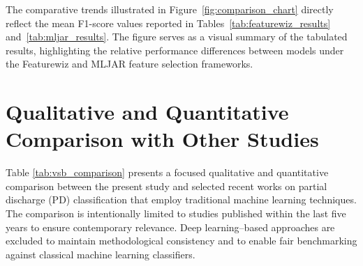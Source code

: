 The comparative trends illustrated in Figure~\ref{fig:comparison_chart} directly reflect the mean F1-score values reported in Tables~\ref{tab:featurewiz_results} and~\ref{tab:mljar_results}. The figure serves as a visual summary of the tabulated results, highlighting the relative performance differences between models under the Featurewiz and MLJAR feature selection frameworks.

\section{Qualitative and Quantitative Comparison with Other Studies}

Table \ref{tab:vsb_comparison} presents a focused qualitative and quantitative comparison between the present study and selected recent works on partial discharge (PD) classification that employ traditional machine learning techniques. The comparison is intentionally limited to studies published within the last five years to ensure contemporary relevance. Deep learning–based approaches are excluded to maintain methodological consistency and to enable fair benchmarking against classical machine learning classifiers.

\begin{table}[H]
    \centering
    \caption{Benchmark Comparison of Partial Discharge Classification Studies with Explicitly Reported Metrics}
    \label{tab:vsb_comparison}
\end{table}



